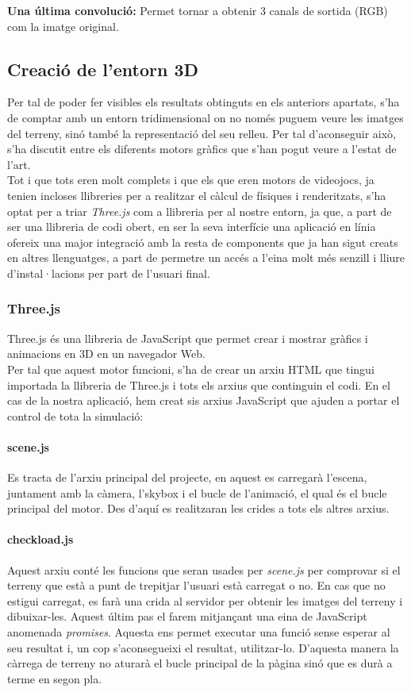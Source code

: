 ﻿\documentclass[10pt,a4paper,twocolumn,twoside]{article}
\begin{document}
\textbf{Una última convolució: }Permet tornar a obtenir 3 canals de sortida (RGB) com la imatge original.
\\
\subsection{Creació de l'entorn 3D}
Per tal de poder fer visibles els resultats obtinguts en els anteriors apartats, s'ha de comptar amb un entorn tridimensional on no només puguem veure les imatges del terreny, sinó també la representació del seu relleu. Per tal d'aconseguir això, s'ha discutit entre els diferents motors gràfics que s'han pogut veure a l'estat de l'art.\\

Tot i que tots eren molt complets i que els que eren motors de videojocs, ja tenien incloses llibreries per a realitzar el càlcul de físiques i renderitzats, s'ha optat per a triar \textit{Three.js} com a llibreria per al nostre entorn, ja que, a part de ser una llibreria de codi obert, en ser la seva interfície una aplicació en línia ofereix una major integració amb la resta de components que ja han sigut creats en altres llenguatges, a part de permetre un accés a l'eina molt més senzill i lliure d'instal·lacions per part de l'usuari final.

\subsubsection{Three.js}
Three.js és una llibreria de JavaScript que permet crear i mostrar gràfics i animacions en 3D en un navegador Web.\\

Per tal que aquest motor funcioni, s'ha de crear un arxiu HTML que tingui importada la llibreria de Three.js i tots els arxius que continguin el codi. En el cas de la nostra aplicació, hem creat sis arxius JavaScript que ajuden a portar el control de tota la simulació:\\
\paragraph{scene.js}
Es tracta de l'arxiu principal del projecte, en aquest es carregarà l'escena, juntament amb la càmera, l'skybox i el bucle de l'animació, el qual és el bucle principal del motor. Des d'aquí es realitzaran les crides a tots els altres arxius.

\paragraph{checkload.js}
Aquest arxiu conté les funcions que seran usades per \textit{scene.js} per comprovar si el terreny que està a punt de trepitjar l'usuari està carregat o no. En cas que no estigui carregat, es farà una crida al servidor per obtenir les imatges del terreny i dibuixar-les. Aquest últim pas el farem mitjançant una eina de JavaScript anomenada \textit{promises}. Aquesta ens permet executar una funció sense esperar al seu resultat i, un cop s'aconsegueixi el resultat, utilitzar-lo. D'aquesta manera la càrrega de terreny no aturarà el bucle principal de la pàgina sinó que es durà a terme en segon pla.
\end{document}
